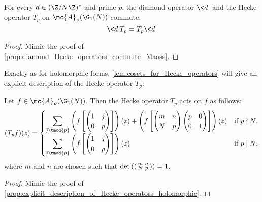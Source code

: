     \begin{proposition}\label{prop:diamond_Hecke_operators_commute_Maass}
      For every $d \in (\Z/N\Z)^{\ast}$ and prime $p$, the diamond operator $\<d\>$ and the Hecke operator $T_{p}$ on $\mc{A}_{\nu}(\G_{1}(N))$ commute:
      \[
        \<d\>T_{p} = T_{p}\<d\>
      \]
    \end{proposition}
    \begin{proof}
      Mimic the proof of \cref{prop:diamond_Hecke_operators_commute_Maass}.
    \end{proof}

    Exactly as for holomorphic forms, \cref{lem:cosets_for_Hecke_operators} will give an explicit description of the Hecke operator $T_{p}$:

    \begin{proposition}\label{prop:explicit_description_of_Hecke_operators_Maass}
      Let $f \in \mc{A}_{\nu}(\G_{1}(N))$. Then the Hecke operator $T_{p}$ acts on $f$ as follows:
      \[
        (T_{p}f)(z) = \begin{cases} \displaystyle{\sum_{j \tmod{p}}}\left(f\left[\begin{pmatrix} 1 & j \\ 0 & p \end{pmatrix}\right]\right)(z)+\left(f\left[\begin{pmatrix} m & n \\ N & p \end{pmatrix}\begin{pmatrix} p & 0 \\ 0 & 1 \end{pmatrix}\right]\right)(z) & \text{if $p \nmid N$}, \\ \displaystyle{\sum_{j \tmod{p}}}\left(f\left[\begin{pmatrix} 1 & j \\ 0 & p \end{pmatrix}\right]\right)(z) & \text{if $p \mid N$}, \end{cases}
      \]
      where $m$ and $n$ are chosen such that $\det\left(\begin{psmallmatrix} m & n \\ N & p \end{psmallmatrix}\right) = 1$.
    \end{proposition}
    \begin{proof}
      Mimic the proof of \cref{prop:explicit_description_of_Hecke_operators_holomorphic}.
    \end{proof}

